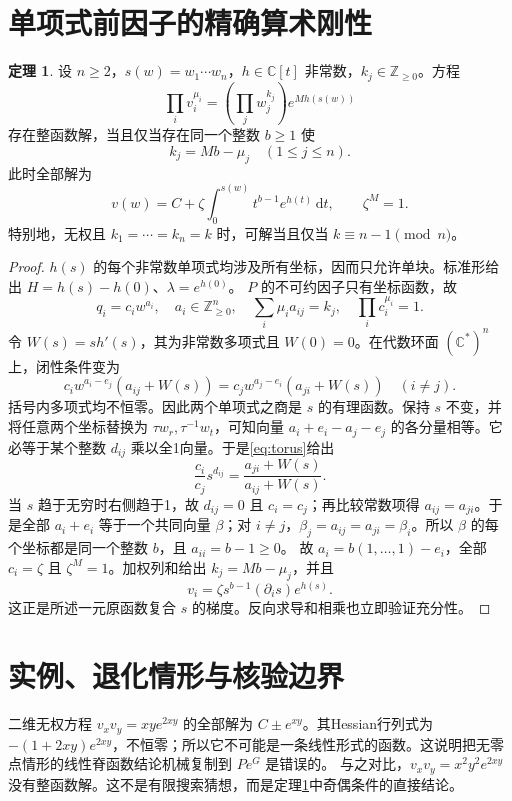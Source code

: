 \documentclass[UTF8,a4paper,zihao=-4,fontset=none]{ctexart}
\numberwithin{equation}{section}
\theoremstyle{definition}
\newtheorem{theorem}{定理}[section]
\theoremstyle{definition}\newtheorem{definition}[theorem]{定义}
\newcommand{\C}{\mathbb C}
\newcommand{\NN}{\mathbb Z_{\ge0}}
\newcommand{\dd}{\,\mathrm d}
\begin{document}
\section{单项式前因子的精确算术刚性}
\begin{theorem}\label{thm:monomial}
设 $n\ge2$，$s(w)=w_1\cdots w_n$，$h\in\C[t]$ 非常数，$k_j\in\NN$。方程
\begin{equation}\label{eq:monomial}
 \prod_i v_i^{\mu_i}=\left(\prod_jw_j^{k_j}\right)e^{M h(s(w))}
\end{equation}
存在整函数解，当且仅当存在同一个整数 $b\ge1$ 使
\[
 k_j=Mb-\mu_j\quad(1\le j\le n).
\]
此时全部解为
\[
 v(w)=C+\zeta\int_0^{s(w)}t^{b-1}e^{h(t)}\dd t,
 \qquad\zeta^M=1.
\]
特别地，无权且 $k_1=\cdots=k_n=k$ 时，可解当且仅当 $k\equiv n-1\pmod n$。
\end{theorem}
\begin{proof}
$h(s)$ 的每个非常数单项式均涉及所有坐标，因而只允许单块。标准形给出 $H=h(s)-h(0)$、$\lambda=e^{h(0)}$。
$P$ 的不可约因子只有坐标函数，故
\[
 q_i=c_iw^{a_i},\quad a_i\in\NN^n,\quad
 \sum_i\mu_i a_{ij}=k_j,\quad\prod_i c_i^{\mu_i}=1.
\]
令 $W(s)=s h'(s)$，其为非常数多项式且 $W(0)=0$。在代数环面 $(\C^*)^n$ 上，闭性条件变为
\begin{equation}\label{eq:torus}
 c_iw^{a_i-e_j}(a_{ij}+W(s))
 =c_jw^{a_j-e_i}(a_{ji}+W(s))\quad(i\ne j).
\end{equation}
括号内多项式均不恒零。因此两个单项式之商是 $s$ 的有理函数。保持 $s$ 不变，并将任意两个坐标替换为 $\tau w_r,\tau^{-1}w_t$，可知向量 $a_i+e_i-a_j-e_j$ 的各分量相等。它必等于某个整数 $d_{ij}$ 乘以全1向量。于是\eqref{eq:torus}给出
\[
 \frac{c_i}{c_j}s^{d_{ij}}
 =\frac{a_{ji}+W(s)}{a_{ij}+W(s)}.
\]
当 $s$ 趋于无穷时右侧趋于1，故 $d_{ij}=0$ 且 $c_i=c_j$；再比较常数项得 $a_{ij}=a_{ji}$。于是全部 $a_i+e_i$ 等于一个共同向量 $\beta$；对 $i\ne j$，$\beta_j=a_{ij}=a_{ji}=\beta_i$。所以 $\beta$ 的每个坐标都是同一个整数 $b$，且 $a_{ii}=b-1\ge0$。
故 $a_i=b(1,\ldots,1)-e_i$，全部 $c_i=\zeta$ 且 $\zeta^M=1$。加权列和给出 $k_j=Mb-\mu_j$，并且
\[
 v_i=\zeta s^{b-1}(\partial_i s)e^{h(s)}.
\]
这正是所述一元原函数复合 $s$ 的梯度。反向求导和相乘也立即验证充分性。
\end{proof}

\section{实例、退化情形与核验边界}
二维无权方程 $v_xv_y=xy e^{2xy}$ 的全部解为 $C\pm e^{xy}$。其Hessian行列式为 $-(1+2xy)e^{2xy}$，不恒零；所以它不可能是一条线性形式的函数。这说明把无零点情形的线性脊函数结论机械复制到 $Pe^G$ 是错误的。
与之对比，$v_xv_y=x^2y^2e^{2xy}$ 没有整函数解。这不是有限搜索猜想，而是定理\ref{thm:monomial}中奇偶条件的直接结论。
\end{document}
